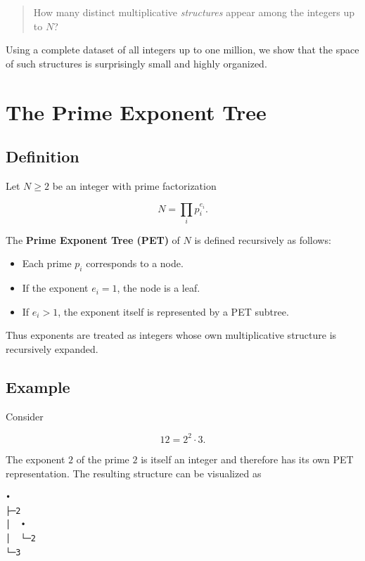 \documentclass[11pt]{article}
\begin{document}
\begin{quote}
How many distinct multiplicative \emph{structures} appear among the integers
up to $N$?
\end{quote}

Using a complete dataset of all integers up to one million, we show that the
space of such structures is surprisingly small and highly organized.

\section{The Prime Exponent Tree}

\subsection{Definition}

Let $N \ge 2$ be an integer with prime factorization

\begin{equation}
N = \prod_i p_i^{e_i}.
\end{equation}

The \textbf{Prime Exponent Tree (PET)} of $N$ is defined recursively as follows:

\begin{itemize}
\item Each prime $p_i$ corresponds to a node.
\item If the exponent $e_i = 1$, the node is a leaf.
\item If $e_i > 1$, the exponent itself is represented by a PET subtree.
\end{itemize}

Thus exponents are treated as integers whose own multiplicative structure
is recursively expanded.

\subsection{Example}

Consider

\begin{equation}
12 = 2^2 \cdot 3.
\end{equation}

The exponent $2$ of the prime $2$ is itself an integer and therefore has
its own PET representation. The resulting structure can be visualized as

\begin{verbatim}
•
├─2
│  •
│  └─2
└─3
\end{verbatim}
\end{document}
